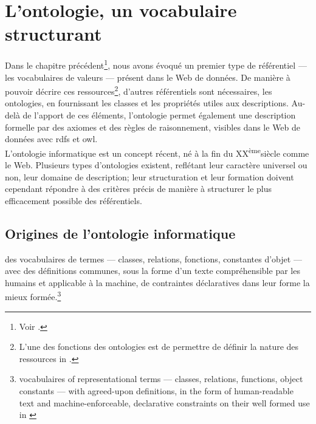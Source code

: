 \section{\label{II-B-1}L'ontologie, un vocabulaire structurant}

Dans le chapitre précédent\footnote{Voir .}, nous avons évoqué un premier type de référentiel --- les vocabulaires de valeurs --- présent dans le Web de données. De manière à pouvoir décrire ces ressources\footnote{\og L'une des fonctions des ontologies est de permettre de définir la nature des ressources\fg{} in \cite[§49]{bermes_convergence_2013}.}, d'autres référentiels sont nécessaires, les ontologies, en fournissant les classes et les propriétés utiles aux descriptions. Au-delà de l'apport de ces éléments, l'ontologie permet également une description formelle par des axiomes et des règles de raisonnement, visibles dans le Web de données avec \ac{rdfs} et \ac{owl}.\\

L'ontologie informatique est un concept récent, né à la fin du \textsc{XX}\textsuperscript{ème}siècle comme le Web. Plusieurs types d'ontologies existent, reflétant leur caractère universel ou non, leur domaine de description; leur structuration et leur formation doivent cependant répondre à des critères précis de manière à structurer le plus efficacement possible des référentiels.

\subsection{\label{II-B-1-a}Origines de l'ontologie informatique}

\begin{citationLongue}
	 des vocabulaires de termes --- classes, relations, fonctions, constantes d'objet --- avec des définitions communes, sous la forme d'un texte compréhensible par les humains et applicable à la machine, de contraintes déclaratives dans leur forme la mieux formée.\footnote{\og vocabulaires of representational terms --- classes, relations, functions, object constants ---  with agreed-upon definitions, in the form of human-readable text and machine-enforceable, declarative constraints on their well formed use\fg{} in \cite[p.2]{gruber_role_1991}}
\end{citationLongue}

